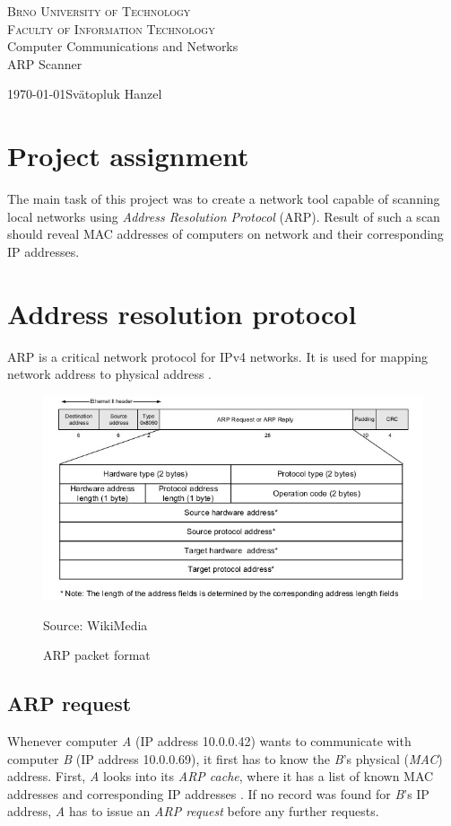 \documentclass[11pt,a4paper]{article}
\newcommand{\source}[1]{\caption*{Source: {#1}} }
\begin{document}
\begin{titlepage}
	\begin{center}
	    {\LARGE\textsc{Brno University of Technology}}\\
	    \smallskip
	    {\Large\textsc{Faculty of Information Technology}}\\
	    \bigskip
	    \LARGE{Computer Communications and Networks}\\
	    \smallskip
		\Huge{ARP Scanner}\\
	\end{center}
    {\today \hfill Svätopluk Hanzel}
\end{titlepage}

\tableofcontents

\newpage
\section{Project assignment}
	The main task of this project was to create a network tool capable of scanning local networks using \emph{Address Resolution Protocol} (ARP). Result of such a scan should reveal MAC addresses of computers on network and their corresponding IP addresses.

\section{Address resolution protocol}
	ARP is a critical network protocol for IPv4 networks. It is used for mapping network address to physical address \cite{RFC0826}\cite{Wiki:ARP}.
	\begin{figure}[h]
		\centering
		\includegraphics[width=0.7\linewidth]{arp.jpg}
		\caption{ARP packet format}
		\label{fig:arp}
		\source{WikiMedia}
	\end{figure}
	
	\subsection{ARP request}
		Whenever computer \emph{A} (IP address 10.0.0.42) wants to communicate with computer \emph{B} (IP address 10.0.0.69), it first has to know the \emph{B}'s physical (\emph{MAC}) address. First, \emph{A} looks into its \emph{ARP cache}, where it has a list of known MAC addresses and corresponding IP addresses \cite{microsoft:arp_cache}. If no record was found for \emph{B}'s IP address, \emph{A} has to issue an \emph{ARP request} before any further requests.
		
\end{document}
